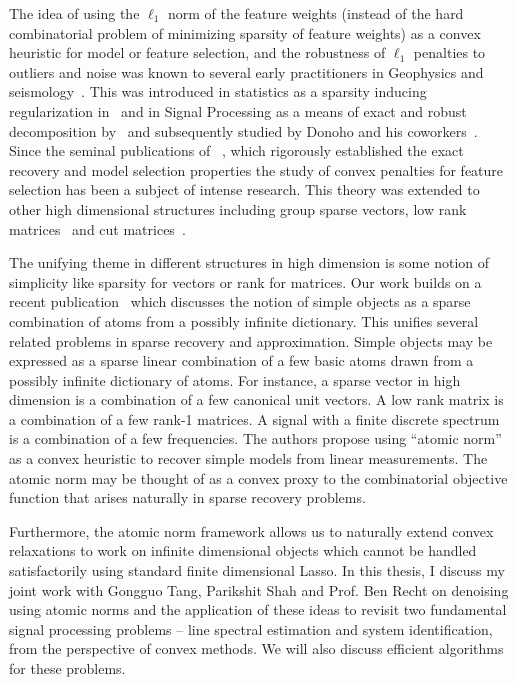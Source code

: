 The idea of using the $\ell_1$ norm of the feature weights (instead of the hard
combinatorial problem of minimizing sparsity of feature weights) as a convex
heuristic for model or feature selection, and the robustness of $\ell_1$
penalties to outliers and noise was known to several early practitioners in
Geophysics and
seismology~\cite{claerbout:robust,taylor:deconvolution,levy:spike-train,santosa}.
This was introduced in statistics as a sparsity inducing regularization
in~\cite{tibshirani96} and in Signal Processing as a means of exact and robust
decomposition by~\cite{chen98} and subsequently studied by Donoho and his
coworkers~\cite{donoho:huo,spark}. Since the seminal publications of
~\cite{CRT06,meinshausen:variable-selection}, which rigorously established the exact recovery and model selection properties the study of convex penalties for
feature selection has been a subject of intense research. This theory was
extended to other high dimensional structures including group sparse
vectors\cite{group:lasso}, low rank matrices~\cite{recht07} and cut
matrices~\cite{cut:goemans}.


The unifying theme in different structures in high dimension is some notion of
simplicity like sparsity for vectors or rank for matrices. Our work builds on a
recent publication~\cite{crpw} which discusses the notion of simple objects as a
sparse combination of atoms from a possibly infinite dictionary. This unifies
several related problems in sparse recovery and approximation. Simple objects
may be expressed as a sparse linear combination of a few basic atoms drawn from
a possibly infinite dictionary of atoms. For instance, a sparse vector in high
dimension is a combination of a few canonical unit vectors. A low rank matrix is
a combination of a few rank-1 matrices. A signal with a finite discrete spectrum
is a combination of a few frequencies. The authors propose using ``atomic norm''
as a convex heuristic to recover simple models from linear measurements. The
atomic norm may be thought of as a convex proxy to the combinatorial objective
function that arises naturally in sparse recovery problems.

Furthermore, the atomic norm framework allows us to naturally extend convex
relaxations to work on infinite dimensional objects which cannot be handled
satisfactorily using standard finite dimensional Lasso. In this thesis, I
discuss my joint work with Gongguo Tang, Parikshit Shah and Prof. Ben Recht on
denoising using atomic norms and the application of these ideas to revisit two
fundamental signal processing problems -- line spectral estimation and system
identification, from the perspective of convex methods. We will also discuss
efficient algorithms for these problems.

